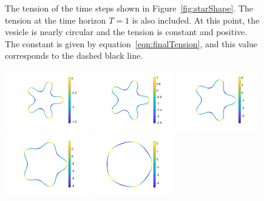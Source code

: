 \documentclass[aps,prl,showpacs]{revtex4}
\begin{document}
\begin{figure}[htp]
\begin{minipage}{0.55\textwidth}
\end{minipage}
  \caption{\label{fig:starTension} The tension of the time steps shown
  in Figure~\ref{fig:starShape}. The tension at the time horizon $T=1$
  is also included. At this point, the vesicle is nearly circular and
  the tension is constant and positive. The constant is given by
  equation~\eqref{eqn:finalTension}, and this value corresponds to the
  dashed black line.}
\end{figure}

\begin{figure}[htp]
\begin{minipage}{0.40\textwidth}

\end{minipage}
\hfill
\begin{minipage}{0.55\textwidth}
\includegraphics[width=0.32\textwidth]{figures/StarFluxTime1.pdf}
\includegraphics[width=0.32\textwidth]{figures/StarFluxTime2.pdf}
\includegraphics[width=0.32\textwidth]{figures/StarFluxTime3.pdf} \\
\includegraphics[width=0.32\textwidth]{figures/StarFluxTime4.pdf}
\includegraphics[width=0.32\textwidth]{figures/StarFluxTime5.pdf}

\end{minipage}
\end{figure}
\end{document}

